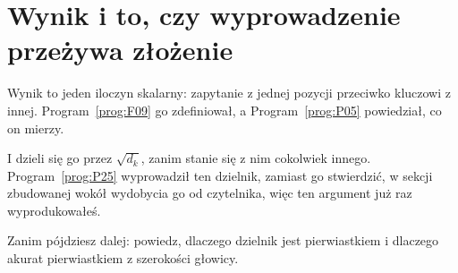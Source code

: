 \section{Wynik i to, czy wyprowadzenie przeżywa złożenie}
\label{sec:P32-score}

\begin{fr}
Wynik to jeden iloczyn skalarny: zapytanie z jednej pozycji przeciwko
kluczowi z innej. Program~\ref{prog:F09} go zdefiniował, a
Program~\ref{prog:P05} powiedział, co on mierzy.

I dzieli się go przez $\sqrt{d_k}$, zanim stanie się z nim cokolwiek innego.
Program~\ref{prog:P25} wyprowadził ten dzielnik, zamiast go stwierdzić, w
sekcji zbudowanej wokół wydobycia go od czytelnika, więc ten argument już raz
wyprodukowałeś.

Zanim pójdziesz dalej: powiedz, dlaczego dzielnik jest pierwiastkiem i
dlaczego akurat pierwiastkiem z szerokości głowicy.
\dotline
\nextframe
\end{fr}

